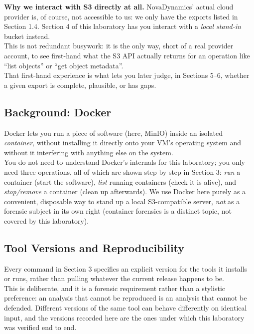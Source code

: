 \noindent
\textbf{Why we interact with S3 directly at all.} NovaDynamics' actual cloud provider is, of
course, not accessible to us: we only have the exports listed in Section 1.4. Section 4 of this laboratory has you interact with a \emph{local stand-in} bucket instead.\\
This is not redundant busywork: it is the only way, short of a real provider account, to see first-hand what the S3 API actually returns for an operation like ``list objects'' or ``get object metadata''.\\
That first-hand experience is what lets you later judge, in Sections 5--6, whether a given export is complete, plausible, or has gaps.

\subsection{Background: Docker}

Docker lets you run a piece of software (here, MinIO) inside an isolated
\emph{container}, without installing it directly onto your VM's operating system and without it interfering with anything else on the system.\\
You do not need to understand Docker's internals for this laboratory; you only need three operations, all of which are shown step by step in
Section 3: \emph{run} a container (start the software), \emph{list} running containers (check it is alive), and \emph{stop/remove} a container (clean up afterwards). We use Docker here purely as a convenient, disposable way to stand up a local S3-compatible server, \emph{not} as a forensic subject in its own right (container forensics is a distinct topic, not covered by this
laboratory).

\subsection{Tool Versions and Reproducibility}

Every command in Section 3 specifies an explicit version for the tools it installs or runs, rather than pulling whatever the current release happens to be. \\
This is deliberate, and it is a forensic requirement rather than a stylistic preference: an analysis that cannot be reproduced is an analysis that cannot be defended. Different versions of the same tool can behave differently on identical input, and the versions recorded here are the ones under which this laboratory was verified end to end.
\medskip

